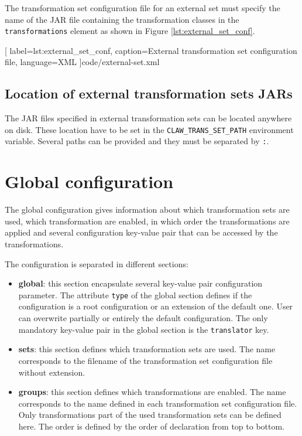 The transformation set configuration file for an external set must specify the
name of the JAR file containing the transformation classes in the
\lstinline|transformations| element as shown in Figure
\ref{lst:external_set_conf}.


  [
    label=lst:external_set_conf,
    caption=External transformation set configuration file,
    language=XML
  ]{code/external-set.xml}

\subsection{Location of external transformation sets JARs}
The JAR files specified in external transformation sets can be located anywhere
on disk. These location have to be set in the \lstinline!CLAW_TRANS_SET_PATH!
environment variable.
Several paths can be provided and they must be separated by \lstinline!:!.


\section{\clawfcomp Global configuration}
The global configuration gives information about which transformation sets are
used, which transformation are enabled, in which order the transformations are
applied and several configuration key-value pair that can be accessed by the
transformations.

The configuration is separated in different sections:
\begin{itemize}
\item \textbf{global}: this section encapsulate several key-value pair
      configuration parameter. The attribute \lstinline!type! of the global
      section defines if the configuration is a root configuration or an
      extension of the default one. User can overwrite partially or entirely
      the default configuration.
      The only mandatory key-value pair in the global section is the
      \lstinline!translator! key.
\item \textbf{sets}: this section defines which transformation sets are used.
      The name corresponds to the filename of the transformation set
      configuration file without extension.
\item \textbf{groups}: this section defines which transformations are enabled.
      The name corresponds to the name defined in each transformation set
      configuration file.
      Only transformations part of the used transformation sets can be defined
      here.
      The order is defined by the order of declaration from top to bottom.
\end{itemize}



